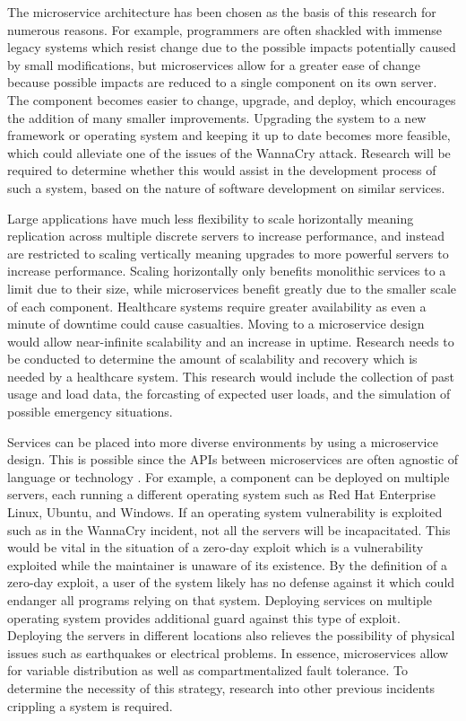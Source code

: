 \documentclass[10pt, oneside, letterpaper]{article}
\begin{document}
\begin{multicols}{2}
	The microservice architecture has been chosen as the basis of this research for numerous reasons. For example, programmers are often shackled with immense legacy systems which resist change due to the possible impacts potentially caused by small modifications, but microservices allow for a greater ease of change because possible impacts are reduced to a single component on its own server. The component becomes easier to change, upgrade, and deploy, which encourages the addition of many smaller improvements. Upgrading the system to a new framework or operating system and keeping it up to date becomes more feasible, which could alleviate one of the issues of the WannaCry attack. Research will be required to determine whether this would assist in the development process of such a system, based on the nature of software development on similar services.

	Large applications have much less flexibility to scale horizontally meaning replication across multiple discrete servers to increase performance, and instead are restricted to scaling vertically meaning upgrades to more powerful servers to increase performance. Scaling horizontally only benefits monolithic services to a limit due to their size, while microservices benefit greatly due to the smaller scale of each component. Healthcare systems require greater availability as even a minute of downtime could cause casualties. Moving to a microservice design would allow near-infinite scalability and an increase in uptime. Research needs to be conducted to determine the amount of scalability and recovery which is needed by a healthcare system. This research would include the collection of past usage and load data, the forcasting of expected user loads, and the simulation of possible emergency situations.

	Services can be placed into more diverse environments by using a microservice design. This is possible since the APIs between microservices are often agnostic of language or technology \cite{Linthicum2016}. For example, a component can be deployed on multiple servers, each running a different operating system such as Red Hat Enterprise Linux, Ubuntu, and Windows. If an operating system vulnerability is exploited such as in the WannaCry incident, not all the servers will be incapacitated. This would be vital in the situation of a zero-day exploit which is a vulnerability exploited while the maintainer is unaware of its existence. By the definition of a zero-day exploit, a user of the system likely has no defense against it which could endanger all programs relying on that system. Deploying services on multiple operating system provides additional guard against this type of exploit. Deploying the servers in different locations also relieves the possibility of physical issues such as earthquakes or electrical problems. In essence, microservices allow for variable distribution as well as compartmentalized fault tolerance. To determine the necessity of this strategy, research into other previous incidents crippling a system is required.


\end{multicols}
\end{document}
